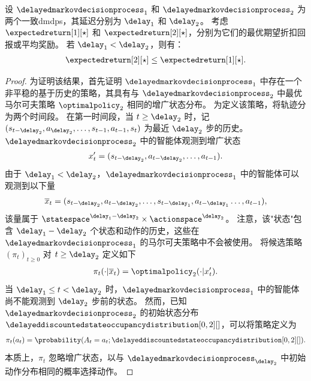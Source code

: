 \begin{thm}
\label{th:perf_delay_vector_all_weight}
    设 $\delayedmarkovdecisionprocess_{1}$ 和 $\delayedmarkovdecisionprocess_{2}$ 为两个一致\glspl{dmdp}，其延迟分别为 $\delay_1$ 和 $\delay_2$。
    考虑 $\expectedreturn[1][\star]$ 和 $\expectedreturn[2][\star]$，分别为它们的最优期望折扣回报或平均奖励。
    若 $\delay_1<\delay_2$，则有：
    \begin{align*}
        \expectedreturn[2][\star] \le \expectedreturn[1][\star].
    \end{align*}
\end{thm}
\begin{proof}
    为证明该结果，首先证明 $\delayedmarkovdecisionprocess_{1}$ 中存在一个非平稳的基于历史的策略，其具有与 $\delayedmarkovdecisionprocess_{2}$ 中最优马尔可夫策略 $\optimalpolicy_2$ 相同的增广状态分布。
    为定义该策略，将轨迹分为两个时间段。
    在第一时间段，当 $t\ge\delay_2$ 时，记 $(s_{t-{\delay_2}},a_{\delay_2},\dots,s_{t-1},a_{t-1},s_t)$ 为最近 $\delay_2$ 步的历史。
    $\delayedmarkovdecisionprocess_{2}$ 中的智能体观测到增广状态
    \begin{align*}
        x_t'=(s_{t-{\delay_2}},a_{t-{\delay_2}},\dots,a_{t-1}).
    \end{align*}
    由于 $\delay_1<\delay_2$，$\delayedmarkovdecisionprocess_{1}$ 中的智能体可以观测到以下量
    \begin{align*}
        \overline x_t=(s_{t-{\delay_2}},a_{t-{\delay_2}},\dots,s_{t-{\delay_1}},a_{t-{\delay_1}}\dots,a_{t-1}),
    \end{align*}
    该量属于 $\statespace^{\delay_1-\delay_2}\times\actionspace^{\delay_2}$。
    注意，该"状态"包含 $\delay_1-\delay_2$ 个状态和动作的历史，这些在 $\delayedmarkovdecisionprocess_{1}$ 的马尔可夫策略中不会被使用。
    将候选策略 $(\pi_t)_{t\ge0}$ 对 $t\ge\delay_2$ 定义如下
    \begin{align*}
        \pi_t(\cdot\vert\overline x_t) = \optimalpolicy_2(\cdot\vert x_t').
    \end{align*}
    当 $\delay_1\le t<\delay_2$ 时，$\delayedmarkovdecisionprocess_{1}$ 中的智能体尚不能观测到 $\delay_2$ 步前的状态。
    然而，已知 $\delayedmarkovdecisionprocess_{2}$ 的初始状态分布 $\delayeddiscountedstateoccupancydistribution[0,2][]$，可以将策略定义为
    \begin{align*}
        \pi_t(a_t) = \probability(A_t=a_t;\delayeddiscountedstateoccupancydistribution[0,2][]).
    \end{align*}
    本质上，$\pi_t$ 忽略增广状态，以与 $\delayedmarkovdecisionprocess_{\delay_2}$ 中初始动作分布相同的概率选择动作。


\end{proof}
